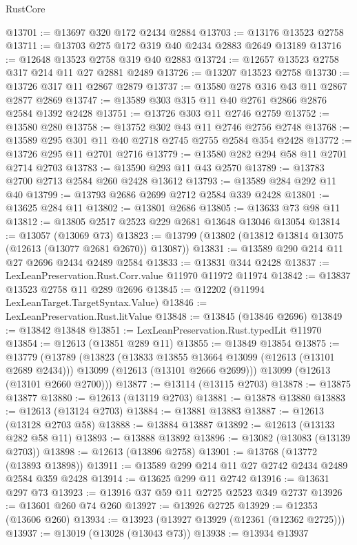 \begin{lexlean}{RustCore}
\begin{coremodule}
@13701 := @13697 @320 @172 @2434 @2884
@13703 := @13176 @13523 @2758
@13711 := @13703 @275 @172 @319 @40 @2434 @2883 @2649 @13189
@13716 := @12648 @13523 @2758 @319 @40 @2883
@13724 := @12657 @13523 @2758 @317 @214 @11 @27 @2881 @2489
@13726 := @13207 @13523 @2758
@13730 := @13726 @317 @11 @2867 @2879
@13737 := @13580 @278 @316 @43 @11 @2867 @2877 @2869
@13747 := @13589 @303 @315 @11 @40 @2761 @2866 @2876 @2584 @1392 @2428
@13751 := @13726 @303 @11 @2746 @2759
@13752 := @13580 @280
@13758 := @13752 @302 @43 @11 @2746 @2756 @2748
@13768 := @13589 @295 @301 @11 @40 @2718 @2745 @2755 @2584 @354 @2428
@13772 := @13726 @295 @11 @2701 @2716
@13779 := @13580 @282 @294 @58 @11 @2701 @2714 @2703
@13783 := @13590 @293 @11 @43 @2570
@13789 := @13783 @2700 @2713 @2584 @260 @2428 @13612
@13793 := @13589 @284 @292 @11 @40
@13799 := @13793 @2686 @2699 @2712 @2584 @339 @2428
@13801 := @13625 @284 @11
@13802 := @13801 @2686
@13805 := @13633 @73 @98 @11
@13812 := @13805 @2517 @2523 @229 @2681 @13648 @13046 @13054
@13814 := @13057 (@13069 @73)
@13823 := @13799 (@13802 (@13812 @13814 @13075 (@12613 (@13077 @2681 @2670)) @13087))
@13831 := @13589 @290 @214 @11 @27 @2696 @2434 @2489 @2584
@13833 := @13831 @344 @2428
@13837 := LexLeanPreservation.Rust.Corr.value @11970 @11972 @11974
@13842 := @13837 @13523 @2758 @11 @289 @2696
@13845 := @12202 (@11994 LexLeanTarget.TargetSyntax.Value)
@13846 := LexLeanPreservation.Rust.litValue
@13848 := @13845 (@13846 @2696)
@13849 := @13842 @13848
@13851 := LexLeanPreservation.Rust.typedLit @11970
@13854 := @12613 (@13851 @289 @11)
@13855 := @13849 @13854
@13875 := @13779
    (@13789
      (@13823
        (@13833 @13855 @13664 @13099 (@12613 (@13101 @2689 @2434)))
        @13099
        (@12613 (@13101 @2666 @2699)))
      @13099
      (@12613 (@13101 @2660 @2700)))
@13877 := @13114 (@13115 @2703)
@13878 := @13875 @13877
@13880 := @12613 (@13119 @2703)
@13881 := @13878 @13880
@13883 := @12613 (@13124 @2703)
@13884 := @13881 @13883
@13887 := @12613 (@13128 @2703 @58)
@13888 := @13884 @13887
@13892 := @12613 (@13133 @282 @58 @11)
@13893 := @13888 @13892
@13896 := @13082 (@13083 (@13139 @2703))
@13898 := @12613 (@13896 @2758)
@13901 := @13768 (@13772 (@13893 @13898))
@13911 := @13589 @299 @214 @11 @27 @2742 @2434 @2489 @2584 @359 @2428
@13914 := @13625 @299 @11 @2742
@13916 := @13631 @297 @73
@13923 := @13916 @37 @59 @11 @2725 @2523 @349 @2737
@13926 := @13601 @260 @74 @260
@13927 := @13926 @2725
@13929 := @12353 (@13606 @260)
@13934 := @13923 (@13927 @13929 (@12361 (@12362 @2725)))
@13937 := @13019 (@13028 (@13043 @73))
@13938 := @13934 @13937

\end{coremodule}
\end{lexlean}
